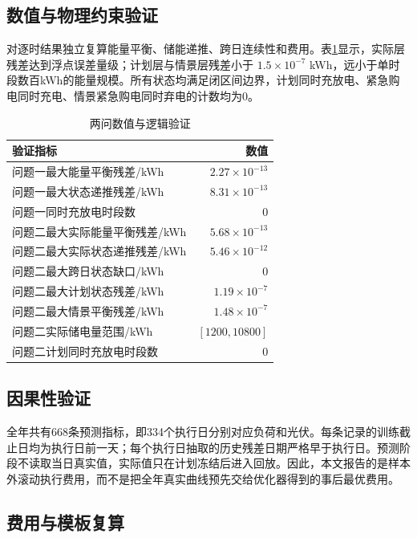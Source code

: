 \documentclass[UTF8,12pt,a4paper]{ctexart}
\begin{document}
\subsection{数值与物理约束验证}

对逐时结果独立复算能量平衡、储能递推、跨日连续性和费用。表\ref{tab:validation}显示，实际层残差达到浮点误差量级；计划层与情景层残差小于 $1.5\times10^{-7}$ kWh，远小于单时段数百kWh的能量规模。所有状态均满足闭区间边界，计划同时充放电、紧急购电同时充电、情景紧急购电同时弃电的计数均为0。

\begin{table}[H]
\centering
\caption{两问数值与逻辑验证}
\label{tab:validation}
\begin{tabular}{p{8.2cm}r}
\toprule
验证指标 & 数值\\
\midrule
问题一最大能量平衡残差/kWh & $2.27\times10^{-13}$\\
问题一最大状态递推残差/kWh & $8.31\times10^{-13}$\\
问题一同时充放电时段数 & 0\\
问题二最大实际能量平衡残差/kWh & $5.68\times10^{-13}$\\
问题二最大实际状态递推残差/kWh & $5.46\times10^{-12}$\\
问题二最大跨日状态缺口/kWh & 0\\
问题二最大计划状态残差/kWh & $1.19\times10^{-7}$\\
问题二最大情景平衡残差/kWh & $1.48\times10^{-7}$\\
问题二实际储电量范围/kWh & $[1200,10800]$\\
问题二计划同时充放电时段数 & 0\\
\bottomrule
\end{tabular}
\end{table}

\subsection{因果性验证}

全年共有668条预测指标，即334个执行日分别对应负荷和光伏。每条记录的训练截止日均为执行日前一天；每个执行日抽取的历史残差日期严格早于执行日。预测阶段不读取当日真实值，实际值只在计划冻结后进入回放。因此，本文报告的是样本外滚动执行费用，而不是把全年真实曲线预先交给优化器得到的事后最优费用。

\subsection{费用与模板复算}
\end{document}
